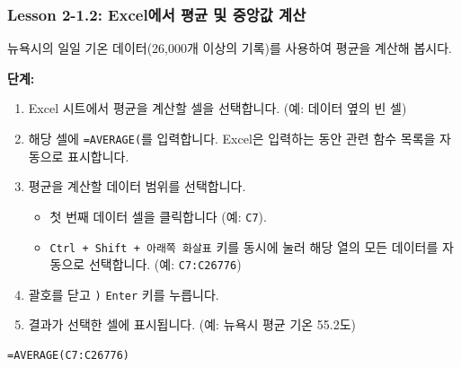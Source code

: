 \documentclass[11pt,a4paper]{book}
\theoremstyle{definition}
\begin{document}
\subsubsection*{Lesson 2-1.2: Excel에서 평균 및 중앙값 계산}

\begin{examplebox}[title={Excel에서 평균 계산하기 (\texttt{AVERAGE} 함수)}]
뉴욕시의 일일 기온 데이터(26,000개 이상의 기록)를 사용하여 평균을 계산해 봅시다.

\textbf{단계:}
\begin{enumerate}
    \item Excel 시트에서 평균을 계산할 셀을 선택합니다. (예: 데이터 옆의 빈 셀)
    \item 해당 셀에 \texttt{=AVERAGE(}를 입력합니다. Excel은 입력하는 동안 관련 함수 목록을 자동으로 표시합니다.
    \item 평균을 계산할 데이터 범위를 선택합니다.
    \begin{itemize}
        \item 첫 번째 데이터 셀을 클릭합니다 (예: \texttt{C7}).
        \item \texttt{Ctrl + Shift + 아래쪽 화살표} 키를 동시에 눌러 해당 열의 모든 데이터를 자동으로 선택합니다. (예: \texttt{C7:C26776})
    \end{itemize}
    \item 괄호를 닫고 \texttt{)} \texttt{Enter} 키를 누릅니다.
    \item 결과가 선택한 셀에 표시됩니다. (예: 뉴욕시 평균 기온 55.2도)
\end{enumerate}
\begin{lstlisting}[caption={Excel AVERAGE 함수 사용 예시}, label={lst:excel_average}]
=AVERAGE(C7:C26776)
\end{lstlisting}
\end{examplebox}
\end{document}
